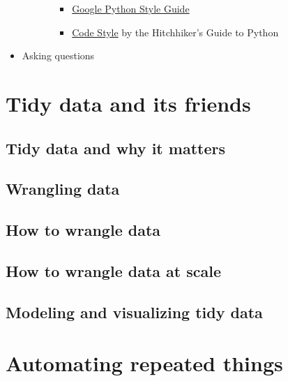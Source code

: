 \documentclass[
]{book}
\providecommand{\tightlist}{%
  \setlength{\itemsep}{0pt}\setlength{\parskip}{0pt}}
\begin{document}
\begin{itemize}
\begin{itemize}
\begin{itemize}
      \begin{itemize}
      \tightlist
      \item
        \href{https://github.com/google/styleguide/blob/gh-pages/pyguide.md}{Google Python Style Guide}
      \item
        \href{https://docs.python-guide.org/writing/style/\#zen-of-python}{Code Style} by the Hitchhiker's Guide to Python
      \end{itemize}
    \end{itemize}
  \end{itemize}
\item
  Asking questions
\end{itemize}

\hypertarget{tidy_data}{%
\chapter{Tidy data and its friends}\label{tidy_data}}

\hypertarget{tidy-data-and-why-it-matters}{%
\section{Tidy data and why it matters}\label{tidy-data-and-why-it-matters}}

\hypertarget{wrangling-data}{%
\section{Wrangling data}\label{wrangling-data}}

\hypertarget{how-to-wrangle-data}{%
\section{How to wrangle data}\label{how-to-wrangle-data}}

\hypertarget{how-to-wrangle-data-at-scale}{%
\section{How to wrangle data at scale}\label{how-to-wrangle-data-at-scale}}

\hypertarget{modeling-and-visualizing-tidy-data}{%
\section{Modeling and visualizing tidy data}\label{modeling-and-visualizing-tidy-data}}

\hypertarget{functional_programming}{%
\chapter{Automating repeated things}\label{functional_programming}}
\end{document}
